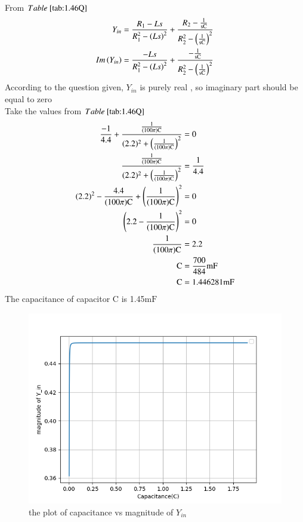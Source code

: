 \documentclass[a4,12pt,onecolumn]{IEEEtran}
\begin{document}
\\From $\tabref{tab:1.46Q}$
\begin{align} 
Y_{in}&=\frac{R_1-Ls}{R_1^2-\left(Ls\right)^2} + \frac{R_2-\frac{1}{ \text{sC}}}{R_2^2-\left(\frac{1}{ \text{sC}}\right)^2}\\
Im\left(Y_{in}\right)&=\frac{-Ls}{R_1^2-\left(Ls\right)^2} + \frac{-\frac{1}{ \text{sC}}}{R_2^2-\left(\frac{1}{ \text{sC}}\right)^2}
\end{align}
According to the question given, $Y_{in}$ is purely real , so imaginary part should be equal to zero\\
Take the values from $\tabref{tab:1.46Q}$\\
\begin{align}
 \frac{-1}{4.4}+\frac{\frac{1}{ (100\pi) \text{C}}}{(2.2)^2+\left(\frac{1}{ (100\pi) \text{C}}\right)^2}&=0\\ 
 \frac{\frac{1}{ (100\pi) \text{C}}}{(2.2)^2+\left(\frac{1}{ (100\pi) \text{C}}\right)^2}&=\frac{1}{4.4}\\
  (2.2)^2-\frac{4.4}{ (100\pi) \text{C}}+\left(\frac{1}{ (100\pi) \text{C}}\right)^2&=0\\
 \left(2.2-\frac{1}{ (100\pi) \text{C}}\right)^2&=0\\
 \frac{1}{ (100\pi) \text{C}}&=2.2\\
 \text{C}&=\frac{700}{484}\text{mF}\\
 \text{C}&=1.446281\text{mF}
\end{align}
The capacitance of capacitor $\text{C}$ is 1.45$\text{mF}$
\begin{figure}[ht!]
\includegraphics[width=\columnwidth]{figs/fig2.png}
\caption{\large{the plot of capacitance vs magnitude of $Y_{in}$}}
\end{figure}
\end{document}
